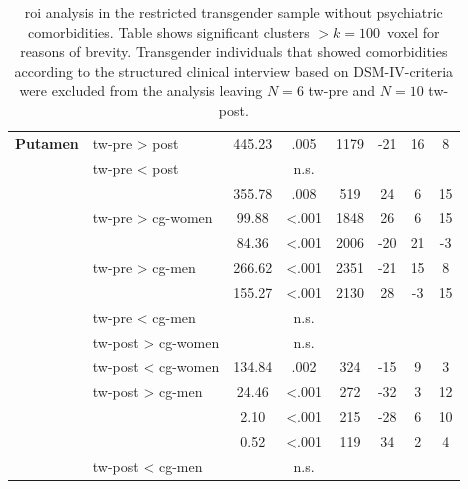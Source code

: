 \documentclass{article}
\begin{document}
\begin{table}[ht]
\begin{center}
\begin{tabular}{rl|S[table-format=3.2]S[table-format=<0.3, add-integer-zero=false]S[table-format=4.0]S[table-format=+2.0]S[table-format=+2.0]S[table-format=+2.0]}
                \textbf{Putamen}  & \ac{tw}-pre > post & 445.23 & .005 & 1179 & -21 & 16 & 8 \\
                & \ac{tw}-pre < post & & {n.s.}\\
                & & 355.78 & .008 & 519 & 24 & 6 & 15 \\
                & \ac{tw}-pre > \ac{cg}-women & 99.88 & \textless{}.001 & 1848 & 26 & 6 & 15 \\
                & & 84.36 & \textless{}.001 & 2006 & -20 & 21 & -3  \\
                & \ac{tw}-pre > \ac{cg}-men & 266.62 & \textless{}.001 & 2351 & -21 & 15 & 8\\
                & & 155.27 & \textless{}.001 & 2130 & 28 & -3 & 15 \\
                & \ac{tw}-pre < \ac{cg}-men & & {n.s.}\\
                & \ac{tw}-post > \ac{cg}-women & & {n.s.}\\
                & \ac{tw}-post < \ac{cg}-women & 134.84 & .002 & 324 & -15 & 9 & 3 \\
                & \ac{tw}-post > \ac{cg}-men & 24.46 & \textless{}.001 & 272 & -32 & 3 & 12 \\
                & & 2.10 & \textless{}.001 & 215 & -28 & 6 & 10 \\
                & & 0.52 & \textless{}.001 & 119 & 34 & 2 & 4\\
                & \ac{tw}-post < \ac{cg}-men & & {n.s.}\\


            \end{tabular}
        \end{center}
        \caption[ROI analysis in the restricted transgender sample without psychiatric comorbidities]{\ac{roi} analysis in the restricted transgender sample without psychiatric comorbidities. Table shows significant clusters $> k = 100$~voxel for reasons of brevity. Transgender individuals that showed comorbidities according to the structured clinical interview based on DSM-IV-criteria were excluded from the analysis leaving $N = 6$ \ac{tw}-pre and $N = 10$ \ac{tw}-post. \\

}
\end{table}
\end{document}
